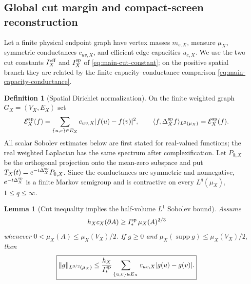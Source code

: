 \documentclass[11pt]{article}
\newtheorem{lemma}[lemma]{Lemma}
\theoremstyle{definition}
\newtheorem{definition}[definition]{Definition}
\theoremstyle{remark}
\newcommand{\supp}{\operatorname{supp}}
\begin{document}
\subsection{Global cut margin and compact-screen reconstruction}

Let a finite physical endpoint graph have vertex masses $m_{v,X}$, measure
$\mu_X$, symmetric conductances $c_{uv,X}$, and efficient edge capacities
$u_{e,X}$.  We use the two cut constants $I_X^{\rm eff}$ and
$I_X^{\rm sp}$ of \eqref{eq:main-cut-constant}; on the positive spatial branch
they are related by the finite capacity--conductance comparison
\eqref{eq:main-capacity-conductance}.

\begin{definition}[Spatial Dirichlet normalization]
\label{def:supp-spatial-dirichlet}
On the finite weighted graph $G_X=(V_X,E_X)$ set
\begin{equation}
 \mathcal E_X^{\rm sp}(f)
 =\sum_{\{u,v\}\in E_X}c_{uv,X}|f(u)-f(v)|^2,
 \qquad
 \langle f,\Delta_X^{\rm sp}f\rangle_{L^2(\mu_X)}
 =\mathcal E_X^{\rm sp}(f).
 \label{eq:supp-spatial-dirichlet}
\end{equation}
All scalar Sobolev estimates below are first stated for real-valued functions;
the real weighted Laplacian has the same spectrum after complexification.  Let
$P_{0,X}$ be the orthogonal projection onto the mean-zero subspace and put
$T_X(t)=e^{-t\Delta_X^{\rm sp}}P_{0,X}$.  Since the conductances are symmetric
and nonnegative, $e^{-t\Delta_X^{\rm sp}}$ is a finite Markov semigroup and is
contractive on every $L^q(\mu_X)$, $1\le q\le\infty$.
\end{definition}

\begin{lemma}[Cut inequality implies the half-volume $L^1$ Sobolev bound]
\label{lem:supp-half-volume-sobolev}
Assume
\begin{equation}
 h_Xc_X(\partial A)\ge I_*^{\rm sp}\,\mu_X(A)^{2/3}
 \label{eq:supp-cut-isoperimetry}
\end{equation}
whenever $0<\mu_X(A)\le\mu_X(V_X)/2$.  If $g\ge0$ and
$\mu_X(\supp g)\le\mu_X(V_X)/2$, then
\begin{equation}
 \boxed{
 \|g\|_{L^{3/2}(\mu_X)}
 \le \frac{h_X}{I_*^{\rm sp}}
 \sum_{\{u,v\}\in E_X}c_{uv,X}|g(u)-g(v)|.}
 \label{eq:supp-l1-sobolev}
\end{equation}
\end{lemma}
\end{document}

